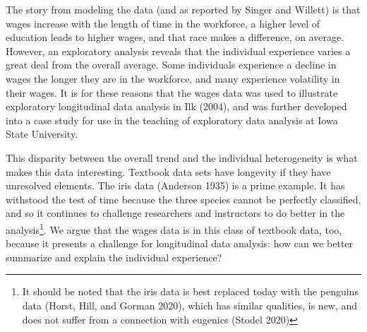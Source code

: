 \documentclass[12pt]{article}
\begin{document}
The story from modeling the data (and as reported by Singer and Willett) is that wages increase with the length of time in the workforce, a higher level of education leads to higher wages, and that race makes a difference, on average. However, an exploratory analysis reveals that the individual experience varies a great deal from the overall average. Some individuals experience a decline in wages the longer they are in the workforce, and many experience volatility in their wages. It is for these reasons that the wages data was used to illustrate exploratory longitudinal data analysis in Ilk (2004), and was further developed into a case study for use in the teaching of exploratory data analysis at Iowa State University.

This disparity between the overall trend and the individual heterogeneity is what makes this data interesting. Textbook data sets have longevity if they have unresolved elements. The iris data (Anderson 1935) is a prime example. It has withstood the test of time because the three species cannot be perfectly classified, and so it continues to challenge researchers and instructors to do better in the analysis\footnote{It should be noted that the iris data is best replaced today with the penguins data (Horst, Hill, and Gorman 2020), which has similar qualities, is new, and does not suffer from a connection with eugenics (Stodel 2020)}. We argue that the wages data is in this class of textbook data, too, because it presents a challenge for longitudinal data analysis: how can we better summarize and explain the individual experience?
\end{document}
